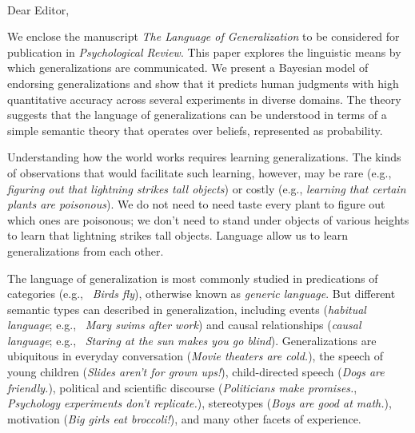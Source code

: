 \documentclass[11pt,letterpaper]{letter} %
\def\opening#1{\thispagestyle{empty}
{\centering\fromaddress \vspace{0.6in} \\ %
\hspace*{\longindentation}\hspace*{\fill}\par} %
\vspace{0.4in} %
\noindent #1 %
}
\begin{document}
\begin{letter}

\opening{Dear Editor,}

We enclose the manuscript \emph{The Language of Generalization} to be considered for publication in \emph{Psychological Review}. 
This paper explores the linguistic means by which generalizations are communicated.  
We present a Bayesian model of endorsing generalizations and show that it predicts human judgments with high quantitative accuracy across several experiments in diverse domains.
The theory suggests that the language of generalizations can be understood in terms of a simple semantic theory that operates over beliefs, represented as probability.

Understanding how the world works requires learning generalizations. 
The kinds of observations that would facilitate such learning, however, may be rare (e.g., \emph{figuring out that lightning strikes tall objects}) or costly (e.g., \emph{learning that certain plants are poisonous}).
We do not need to need taste every plant to figure out which ones are poisonous; we don't need to stand under objects of various heights to learn that lightning strikes tall objects.
Language allow us to learn generalizations from each other.

The language of generalization is most commonly studied in predications of categories (e.g., ~\emph{Birds fly}), otherwise known as \emph{generic language}.
But different semantic types can described in generalization, including events (\emph{habitual language}; e.g., ~\emph{Mary swims after work}) and causal relationships (\emph{causal language}; e.g., ~\emph{Staring at the sun makes you go blind}).
Generalizations are ubiquitous in everyday conversation (\emph{Movie theaters are cold.}), the speech of young children (\emph{Slides aren't for grown ups!}), child-directed speech (\emph{Dogs are friendly.}), political and scientific discourse (\emph{Politicians make promises.}, \emph{Psychology experiments don't replicate.}), stereotypes (\emph{Boys are good at math.}), motivation (\emph{Big girls eat broccoli!}), and many other facets of experience.



\end{letter}
\end{document}
